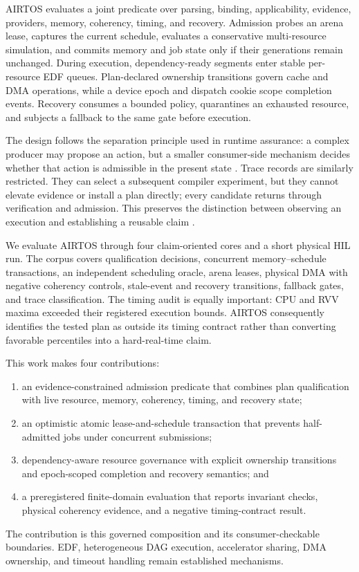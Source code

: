 \documentclass[lettersize,journal]{IEEEtran}
\begin{document}
AIRTOS evaluates a joint predicate over parsing, binding, applicability,
evidence, providers, memory, coherency, timing, and recovery. Admission probes
an arena lease, captures the current schedule, evaluates a conservative
multi-resource simulation, and commits memory and job state only if their
generations remain unchanged. During execution, dependency-ready segments
enter stable per-resource EDF queues. Plan-declared ownership transitions
govern cache and DMA operations, while a device epoch and dispatch cookie
scope completion events. Recovery consumes a bounded policy, quarantines an
exhausted resource, and subjects a fallback to the same gate before execution.

The design follows the separation principle used in runtime assurance: a
complex producer may propose an action, but a smaller consumer-side mechanism
decides whether that action is admissible in the present state
\cite{seto1998simplex,hobbs2023runtime}. Trace records are similarly
restricted. They can select a subsequent compiler experiment, but they cannot
elevate evidence or install a plan directly; every candidate returns through
verification and admission. This preserves the distinction between observing
an execution and establishing a reusable claim \cite{leucker2009brief}.

We evaluate AIRTOS through four claim-oriented cores and a short physical HIL
run. The corpus covers qualification decisions, concurrent memory--schedule
transactions, an independent scheduling oracle, arena leases, physical DMA
with negative coherency controls, stale-event and recovery transitions,
fallback gates, and trace classification. The timing audit is equally
important: CPU and RVV maxima exceeded their registered execution bounds.
AIRTOS consequently identifies the tested plan as outside its timing contract
rather than converting favorable percentiles into a hard-real-time claim.

This work makes four contributions:
\begin{enumerate}
  \item an evidence-constrained admission predicate that combines plan
  qualification with live resource, memory, coherency, timing, and recovery
  state;
  \item an optimistic atomic lease-and-schedule transaction that prevents
  half-admitted jobs under concurrent submissions;
  \item dependency-aware resource governance with explicit ownership
  transitions and epoch-scoped completion and recovery semantics; and
  \item a preregistered finite-domain evaluation that reports invariant checks,
  physical coherency evidence, and a negative timing-contract result.
\end{enumerate}
The contribution is this governed composition and its consumer-checkable
boundaries. EDF, heterogeneous DAG execution, accelerator sharing, DMA
ownership, and timeout handling remain established mechanisms.
\end{document}

